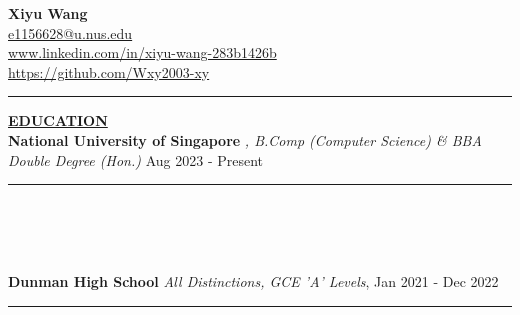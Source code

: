 \documentclass{article}
\begin{document}
\begin{center}
\thispagestyle{empty}
\large \textbf{Xiyu Wang} \\
\normalsize \href{mailto:e1156628@u.nus.edu}{e1156628@u.nus.edu} \\
\href{https://www.linkedin.com/in/xiyu-wang-283b1426b}{www.linkedin.com/in/xiyu-wang-283b1426b} \\
\href{https://github.com/Wxy2003-xy}{https://github.com/Wxy2003-xy}   
\noindent\rule{\linewidth}{0.4pt}
\end{center}

\vspace{-0.4cm}
\noindent \textbf{\underline{EDUCATION}} \\
\indent\textbf{National University of Singapore} \textit{, B.Comp (Computer Science) \& BBA Double Degree (Hon.)} Aug 2023 - Present \\
\vspace{-0.7cm} %

\indent\rule{\linewidth}{0.4pt} %
\indent \textbullet{}  \\
\indent \text{} \\
\indent \textbullet{} \\
\vspace{-0.2cm}

\indent\textbf{Dunman High School} \hfill \textit{All Distinctions, GCE 'A' Levels}, Jan 2021 - Dec 2022\\
\vspace{-0.7cm} %

\indent\rule{\linewidth}{0.4pt} %
\indent \textbullet{} \noindent {} \\
\indent \textbullet{} \noindent {} \\

\vspace{-0.2cm}
\end{document}
